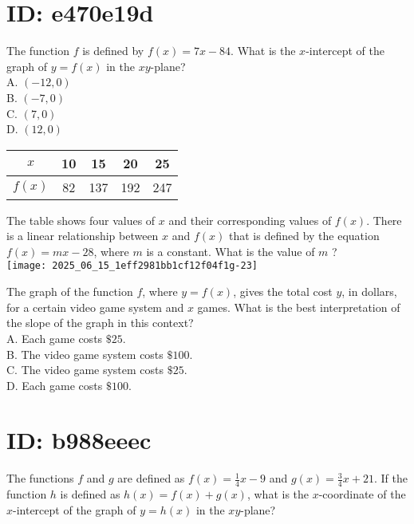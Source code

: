 









\section*{ID: e470e19d}
The function $f$ is defined by $f(x)=7 x-84$. What is the $x$-intercept of the graph of $y=f(x)$ in the $x y$-plane?\\
A. $(-12,0)$\\
B. $(-7,0)$\\
C. $(7,0)$\\
D. $(12,0)$

\begin{center}
\begin{tabular}{|c|c|c|c|c|}
\hline
$x$ & 10 & 15 & 20 & 25 \\
\hline
$f(x)$ & 82 & 137 & 192 & 247 \\
\hline
\end{tabular}
\end{center}

The table shows four values of $x$ and their corresponding values of $f(x)$. There is a linear relationship between $x$ and $f(x)$ that is defined by the equation $f(x)=m x-28$, where $m$ is a constant. What is the value of $m$ ?\\
\texttt{[image: 2025\_06\_15\_1eff2981bb1cf12f04f1g-23]}

The graph of the function $f$, where $y=f(x)$, gives the total cost $y$, in dollars, for a certain video game system and $x$ games. What is the best interpretation of the slope of the graph in this context?\\
A. Each game costs $\$ 25$.\\
B. The video game system costs $\$ 100$.\\
C. The video game system costs $\$ 25$.\\
D. Each game costs $\$ 100$.

\section*{ID: b988eeec}
The functions $f$ and $g$ are defined as $f(x)=\frac{1}{4} x-9$ and $g(x)=\frac{3}{4} x+21$. If the function $h$ is defined as $h(x)=f(x)+g(x)$, what is the $x$-coordinate of the $x$-intercept of the graph of $y=h(x)$ in the $x y$-plane?


